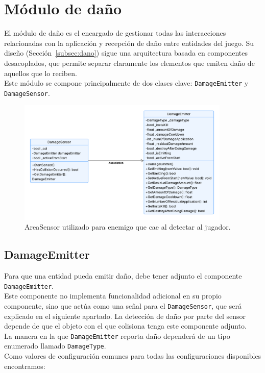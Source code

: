 \section{Módulo de daño}
El módulo de daño es el encargado de gestionar todas las interacciones relacionadas con la aplicación y recepción de daño entre entidades del juego. Su diseño (Sección~\ref{subsec:dano}) sigue una arquitectura basada en componentes desacoplados, que permite separar claramente los elementos que emiten daño de aquellos que lo reciben.\\

Este módulo se compone principalmente de dos clases clave: \texttt{DamageEmitter} y \texttt{DamageSensor}.

\begin{figure}[t]
		\centering
		\includegraphics[width = 0.9\textwidth]{Imagenes/DamageUML.png}
		\caption{AreaSensor utilizado para enemigo que cae al detectar al jugador.}
		\label{fig:AreaSensor_Image}
\end{figure}
\subsection{DamageEmitter}
Para que una entidad pueda emitir daño, debe tener adjunto el componente \texttt{DamageEmitter}.\\
Este componente no implementa funcionalidad adicional en su propio componente, sino que actúa como una señal para el \texttt{DamageSensor}, que será explicado en el siguiente apartado. La detección de daño por parte del sensor depende de que el objeto con el que colisiona tenga este componente adjunto.\\

La manera en la que \texttt{DamageEmitter} reporta daño dependerá de un tipo enumerado llamado \texttt{DamageType}.\\
Como valores de configuración comunes para todas las configuraciones disponibles encontramos:\\

